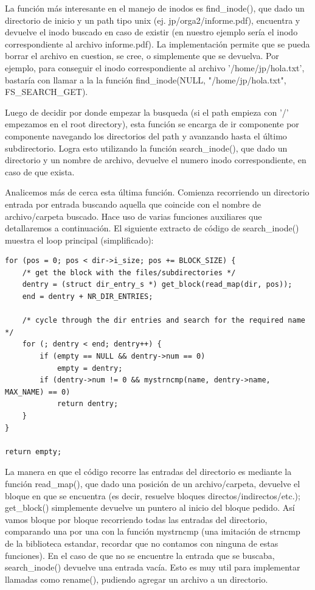 La función más interesante en el manejo de inodos es find\_inode(), que dado un
directorio de inicio y un path tipo unix (ej. jp/orga2/informe.pdf), encuentra y
devuelve el inodo buscado en caso de existir (en nuestro ejemplo sería el inodo
correspondiente al archivo informe.pdf). La implementación permite que se pueda
borrar el archivo en cuestion, se cree, o simplemente que se devuelva. Por
ejemplo, para conseguir el inodo correspondiente al archivo '/home/jp/hola.txt',
bastaría con llamar a la la función find\_inode(NULL, "/home/jp/hola.txt",
FS\_SEARCH\_GET).

Luego de decidir por donde empezar la busqueda (si el path empieza con '/'
empezamos en el root directory), esta función se encarga de ir componente por
componente navegando los directorios del path y avanzando hasta el último
subdirectorio. Logra esto utilizando la función search\_inode(), que dado un
directorio y un nombre de archivo, devuelve el numero inodo correspondiente, en
caso de que exista.

Analicemos más de cerca esta última función. Comienza recorriendo un
directorio entrada por entrada buscando aquella que coincide con el nombre de
archivo/carpeta buscado. Hace uso de varias funciones auxiliares que
detallaremos a continuación. El siguiente extracto de código de search\_inode()
muestra el loop principal (simplificado):

\begin{verbatim}
for (pos = 0; pos < dir->i_size; pos += BLOCK_SIZE) {
    /* get the block with the files/subdirectories */
    dentry = (struct dir_entry_s *) get_block(read_map(dir, pos));
    end = dentry + NR_DIR_ENTRIES;

    /* cycle through the dir entries and search for the required name */
    for (; dentry < end; dentry++) {
        if (empty == NULL && dentry->num == 0)
            empty = dentry;
        if (dentry->num != 0 && mystrncmp(name, dentry->name, MAX_NAME) == 0)
            return dentry;
    }
}

return empty;
\end{verbatim}

La manera en que el código recorre las entradas del directorio es mediante la
función read\_map(), que dado una posición de un archivo/carpeta, devuelve el
bloque en que se encuentra (es decir, resuelve bloques
directos/indirectos/etc.); get\_block() simplemente devuelve
un puntero al inicio del bloque pedido. Así vamos bloque por bloque recorriendo
todas las entradas del directorio, comparando una por una con la función
mystrncmp (una imitación de strncmp de la biblioteca estandar, recordar que no
contamos con ninguna de estas funciones). En el caso de que no se encuentre la
entrada que se buscaba, search\_inode() devuelve una entrada vacía. Esto es muy
util para implementar llamadas como rename(), pudiendo agregar un archivo a un
directorio.

